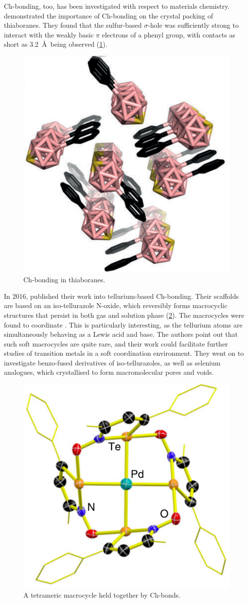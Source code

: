 \begin{refsection}
Ch-bonding, too, has been investigated with respect to materials chemistry.
\citeauthor{Fanfrlik2014} demonstrated the importance of Ch-bonding on the crystal packing of thiaboranes.\autocite{Fanfrlik2014}
They found that the sulfur-based $ \sigma $-hole was sufficiently strong to interact with the weakly basic $ \pi $ electrons of a phenyl group, with contacts as short as 3.2~\AA\ being observed (\cref{fig:thiaborane-ch-bond}).

\begin{figure}
    \centering
    \includegraphics[width=0.45\linewidth]{Figures/thiaborane-ch-bond.pdf}
    \caption{Ch-bonding in thiaboranes.\autocite{Fanfrlik2014}}\label{fig:thiaborane-ch-bond}
\end{figure}

In 2016, \citeauthor{Ho2016} published their work into tellurium-based Ch-bonding.\autocite{Ho2016}
Their scaffolds are based on an iso-tellurazole N-oxide, which reversibly forms macrocyclic structures that persist in both gas and solution phase (\cref{fig:te-pd-macrocycle}).
The macrocycles were found to coordinate .
This is particularly interesting, as the tellurium atoms are simultaneously behaving as a Lewis acid and base.
The authors point out that such soft macrocycles are quite rare, and their work could facilitate further studies of transition metals in a soft coordination environment.
They went on to investigate benzo-fused derivatives of iso-tellurazoles, as well as selenium analogues, which crystallised to form macromolecular pores and voids.\autocite{Ho2017}

\begin{figure}
    \centering
    \includegraphics[width=0.4\linewidth]{Figures/te-pd-macrocycle.pdf}
    \caption{A tetrameric macrocycle held together by Ch-bonds.\autocite{Ho2016}}\label{fig:te-pd-macrocycle}
\end{figure}


\end{refsection}
